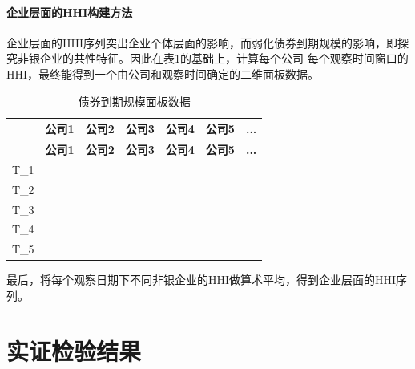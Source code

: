 \documentclass[a4paper,12pt]{report}
\begin{document}
        \subsubsection{企业层面的HHI构建方法}
            企业层面的HHI序列突出企业个体层面的影响，而弱化债券到期规模的影响，即探究非银企业的共性特征。因此在表1的基础上，计算每个公司
            每个观察时间窗口的HHI，最终能得到一个由公司和观察时间确定的二维面板数据。
            \begin{longtable}{|l|c|r|r|r|r|r|}
                \caption{债券到期规模面板数据} \label{tab:bond-distribution} \\
                
                \hline
                \textbf{ } & \textbf{公司1} & \textbf{公司2} & \textbf{公司3} & \textbf{公司4} & \textbf{公司5} & \textbf{  ...  }   \\ \hline
                \endfirsthead
                
                \hline
                \textbf{ } & \textbf{公司1} & \textbf{公司2} & \textbf{公司3} & \textbf{公司4} & \textbf{公司5} & \textbf{  ...  }   \\ \hline
                \endhead
                
                \hline
                \endfoot
                
                T\_1 &  &  &  &  &  &    \\ \hline
                T\_2 &  &  &  &  &  &    \\ \hline
                T\_3 &  &  &  &  &  &    \\ \hline
                T\_4 &  &  &  &  &  &    \\ \hline
                T\_5 &  &  &  &  &  &    \\ \hline
                
            \end{longtable}
            最后，将每个观察日期下不同非银企业的HHI做算术平均，得到企业层面的HHI序列。
        


    \chapter{实证检验结果}
\end{document}
